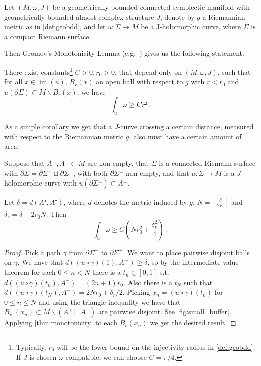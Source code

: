 \documentclass[12pt,a4paper,abstract=true,draft]{scrartcl}
\DeclareMathOperator{\im}{im}
\begin{document}
Let $(M,ω,J)$ be a geometrically bounded connected symplectic manifold with geometrically bounded almost complex structure $J$, denote by $g$ a Riemannian metric as in \cref{def:geobdd}, and let $u\colon Σ → M$ be a J-holomorphic curve, where $Σ$ is a compact Riemann surface.

Then Gromov's Monotonicity Lemma (e.g.\ \cite[Proposition 4.3.1 (ii)]{sikorav1994}) gives us the following statement:

\begin{lemma}[Monotonicity]
  \label{thm:monotonicity}
  There exist constants\footnote{Typically, $r_0$ will be the lower bound on the injectivity radius in \cref{def:geobdd}.
If $J$ is chosen $ω$-compatible, we can choose $C=π/4$.} $C>0, r_0>0$, that depend only on $(M,ω,J)$, such that for all $x ∈ \im(u)$, $B_r(x)$ an open ball with respect to $g$ with $r<r_0$ and $u(∂Σ) ⊂ M ∖ B_r(x)$, we have
  \[∫_u ω ≥ C r² \; .\]
\end{lemma}

As a simple corollary we get that a $J$-curve crossing a certain distance, measured with respect to the Riemannian metric $g$, also must have a certain amount of area:

\begin{corollary}
  \label{thm:small_buffer}
  Suppose that $A^+, A^- ⊂ M$ are non-empty, that $Σ$ is a connected Riemann surface with $∂Σ = ∂Σ^+ ⊔ ∂Σ^-$, with both $∂Σ^±$ non-empty, and that $u\colon Σ → M$ is a $J$-holomorphic curve with $u(∂Σ^±) ⊂ A^±$.
  
  Let $δ=d(A⁺,A⁻)$, where $d$ denotes the metric induced by $g$, $N=\left\lfloor \frac{δ}{2r_0} \right\rfloor$ and $δ_r = δ-2r_0 N$.
  Then
  \[∫_u ω ≥ C(Nr_0^2+\frac{δ_r^2}{4}) \; .\]
\end{corollary}

\begin{proof}
  Pick a path $γ$ from $∂Σ^-$ to $∂Σ^+$.
  We want to place pairwise disjoint balls on $γ$.
  We have that $d((u ∘ γ) (1),A^-) ≥ δ$, so by the intermediate value theorem for each $0 ≤ n < N$ there is a $t_n ∈ [0,1]$ s.t.\ $d((u ∘ γ) (t_n),A^-) = (2n+1)r_0$.
  Also there is a $t_N$ such that $d((u ∘ γ) (t_N),A^-) = 2Nr_0 + δ_r/2$.
  Picking $x_n = (u ∘ γ)(t_n)$ for $0 ≤ n ≤ N$ and using the triangle inequality we have that $B_{r_0}(x_n) ⊂ M ∖ ( A^+ ⊔ A^-)$ are pairwise disjoint.
  See \cref{fig:small_buffer}.
  Applying \cref{thm:monotonicity} to each $B_r(x_n)$ we get the desired result.
\end{proof}
\end{document}
